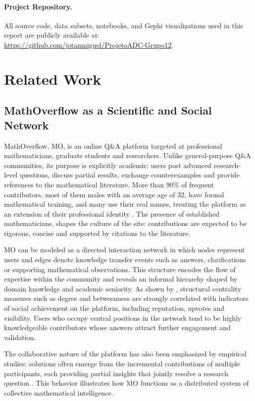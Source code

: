 \documentclass[sigplan]{acmart}
\begin{document}
    \paragraph{Project Repository.}
        All source code, data subsets, notebooks, and Gephi visualizations used in this report are publicly available at:\\
        \url{https://github.com/jotanmiguel/ProjetoADC-Grupo12}.

\section{Related Work}\label{sec:related-work}
    \subsection{MathOverflow as a Scientific and Social Network}
        MathOverflow, MO, is an online Q\&A platform targeted at professional mathematicians, graduate students and researchers. Unlike general-purpose Q\&A communities, its purpose is explicitly academic: users post advanced research-level questions, discuss partial results, exchange counterexamples and provide references to the mathematical literature.
        More than 90\% of frequent contributors, most of them males with an average age of 32, have formal mathematical training, and many use their real names, treating the platform as an extension of their professional identity \cite{participation2013}. The presence of established mathematicians, shapes the culture of the site: contributions are expected to be rigorous, concise and supported by citations to the literature.

        MO can be modeled as a directed interaction network in which nodes represent users and edges denote knowledge transfer events such as answers, clarifications or supporting mathematical observations. This structure encodes the flow of expertise within the community and reveals an informal hierarchy shaped by domain knowledge and academic seniority. As shown by \citeauthor{socialMathoveflow2013}\cite{socialMathoveflow2013}, structural centrality measures such as degree and betweenness are strongly correlated with indicators of social achievement on the
        platform, including reputation, upvotes and visibility. Users who occupy central
        positions in the network tend to be highly knowledgeable contributors whose
        answers attract further engagement and validation.
        
        The collaborative nature of the platform has also been emphasized by empirical
        studies: solutions often emerge from the incremental contributions of multiple
        participants, each providing partial insights that jointly resolve a research
        question \cite{collaborative2012}. This behavior illustrates how MO functions as a
        distributed system of collective mathematical intelligence.
        
\end{document}
